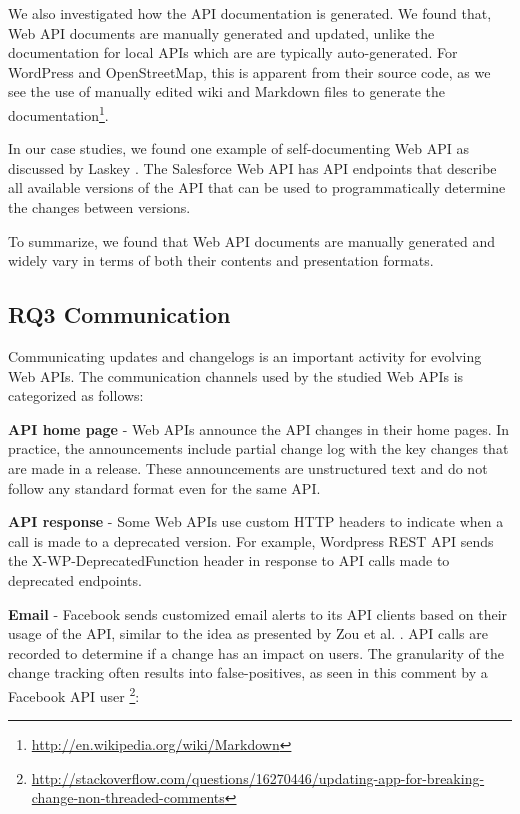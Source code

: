 \documentclass[conference]{IEEEtran}
\begin{document}
We also investigated how the API documentation is generated. We found that, Web API documents are manually generated and updated, unlike the documentation for local APIs which are are typically auto-generated. For WordPress and OpenStreetMap, this is apparent from their source code, as we see the use of manually edited wiki and Markdown files to generate the documentation\footnote{\url{http://en.wikipedia.org/wiki/Markdown}}.

In our case studies, we found one example of self-documenting Web API as discussed by Laskey \cite{laskey2008considerations}. The Salesforce Web API has API endpoints that describe all available versions of the API that can be used to programmatically determine the changes between versions.

To summarize, we found that Web API documents are manually generated and widely vary in terms of both their contents and presentation formats.

\subsection{RQ3 Communication} %
\label{sub:communication}

Communicating updates and changelogs is an important activity for evolving Web APIs. The communication channels used by the studied Web APIs is categorized as follows:


  \textbf{API home page} - Web APIs announce the API changes in their home pages. In practice, the announcements include partial change log with the key changes that are made in a release. These announcements are unstructured text and do not follow any standard format even for the same API.

  \textbf{API response} - Some Web APIs use custom HTTP headers to indicate when a call is made to a deprecated version. For example, Wordpress REST API sends the X-WP-DeprecatedFunction header in response to API calls made to deprecated endpoints.

  \textbf{Email} - Facebook sends customized email alerts to its API clients based on their usage of the API, similar to the idea as presented by Zou et al. \cite{le2008synchronizing}. API calls are recorded to determine if a change has an impact on users. The granularity of the change tracking often results into false-positives, as seen in this comment by a Facebook API user \footnote{\url{http://stackoverflow.com/questions/16270446/updating-app-for-breaking-change-non-threaded-comments}}:
\end{document}

